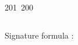 201~200~\documentclass{article}
\begin{document}
\begin{lstlisting}[language=Python, caption=Signature function Chall 2]
	                                                                        	                                                                    	                                	                    	                    	                        	                        	                    	                                                                	                	                                                                    	                    							                                                                                                                                                                                                    \end{lstlisting}


	                                                                        	                                                                    	                                	                    	                    	                        	                        	                    	                                                                	                	                                                                    	                    							                                                                                                                                                                                                    Signature formula : 
\end{document}
